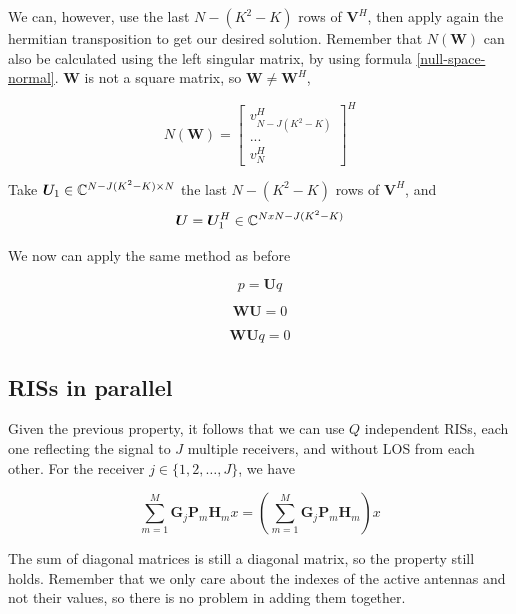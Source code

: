 We can, however, use the last $N - (K^2 - K)$ rows of $\bm{V}^H$, then apply again the hermitian transposition to get our desired solution. Remember that $N(\bm{W})$ can also be calculated using the left singular matrix, by using formula \eqref{null-space-normal}. $\bm{W}$ is not a square matrix, so $\bm{W} \ne \bm{W}^H$,

\begin{equation}
  N(\bm{W}) = \begin{bmatrix} v^H_{N - J(K^2 - K)} \\ ... \\ v^H_N \end{bmatrix} ^ H
\end{equation}

Take $\bm{U}_1 \in \mathbb{C} ^ {N - J(K^2 - K) \times N}$ the last $N - (K^2 - K)$ rows of $\bm{V}^H$, and
\begin{equation}
  \bm{U} = \bm{U}_1^H \in \mathbb{C} ^ {N x N - J(K^2 - K)}
\end{equation}

We now can apply the same method as before

\begin{equation}p = \bm{U}q\end{equation}

\begin{equation}\bm{WU} = 0\end{equation}

\begin{equation}\bm{WU}q = 0\end{equation}

\subsection{RISs in parallel}

Given the previous property, it follows that we can use $Q$ independent RISs, each one reflecting the signal to $J$ multiple receivers, and without LOS from each other. For the receiver $j \in \{1, 2, \ldots , J\}$, we have

\begin{equation}
  \sum_{m=1}^M \bm{G}_j \bm{P}_m \bm{H}_m x = (\sum_{m=1}^M \bm{G}_j \bm{P}_m \bm{H}_m) x
\end{equation}

The sum of diagonal matrices is still a diagonal matrix, so the property still holds. Remember that we only care about the indexes of the active antennas and not their values, so there is no problem in adding them together.

